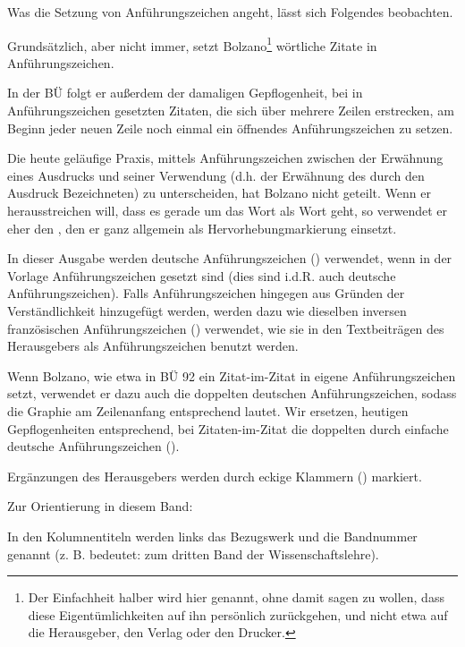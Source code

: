 {\begin{aufza}
\item Was die Setzung von Anführungszeichen angeht, lässt sich Folgendes beobachten.
\begin{aufzb}
\item Grundsätzlich, aber nicht immer, setzt Bolzano\footnote{%
	Der Einfachheit halber wird hier  genannt, ohne damit sagen zu wollen, dass diese Eigentümlichkeiten auf ihn persönlich zurückgehen, und nicht etwa auf die Herausgeber, den Verlag oder den Drucker.}
wörtliche Zitate in Anführungszeichen. 
\item In der BÜ folgt er außerdem der damaligen Gepflogenheit, bei in Anführungszeichen gesetzten Zitaten, die sich über mehrere Zeilen erstrecken, am Beginn jeder neuen Zeile noch einmal ein öffnendes Anführungszeichen zu setzen.
\item Die heute geläufige Praxis, mittels Anführungszeichen zwischen der Erwähnung eines Ausdrucks und seiner Verwendung (d.h. der Erwähnung des durch den Ausdruck Bezeichneten) zu unterscheiden, hat Bolzano nicht geteilt. Wenn er herausstreichen will, dass es gerade um das Wort als Wort geht, so verwendet er eher den , den er ganz allgemein als Hervorhebungmarkierung einsetzt. 
\item In dieser Ausgabe werden deutsche Anführungszeichen (\danf{\ }) verwendet, wenn in der Vorlage Anführungszeichen gesetzt sind (dies sind i.d.R. auch deutsche Anführungszeichen). Falls Anführungszeichen hingegen aus Gründen der Verständlichkeit hinzugefügt werden, werden dazu wie dieselben inversen französischen Anführungszeichen (\anf{\ }) verwendet, wie sie in den Textbeiträgen des Herausgebers als Anführungszeichen benutzt werden.
\item Wenn Bolzano, wie etwa in BÜ 92 ein Zitat-im-Zitat in eigene Anführungszeichen setzt, verwendet er dazu auch die doppelten deutschen Anführungszeichen, sodass die Graphie am Zeilenanfang entsprechend \fbox{\glqq\glqq} lautet. Wir ersetzen, heutigen Gepflogenheiten entsprechend, bei Zitaten-im-Zitat die doppelten durch einfache deutsche Anführungszeichen (\deinfanf{\ }).
\end{aufzb}
\item Ergänzungen des Herausgebers werden durch eckige Klammern (\erg{\ }) markiert.
\item Zur Orientierung in diesem Band:
\begin{aufzb}
\item In den Kolumnentiteln werden links das Bezugswerk und die Bandnummer genannt (z. B.  bedeutet: zum dritten Band der Wissenschaftslehre). 

\end{aufzb}
\end{aufza}}
